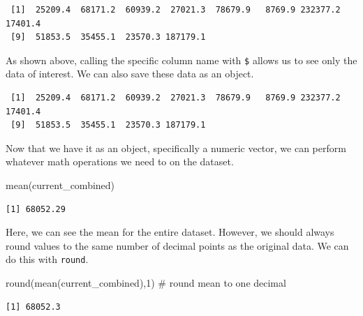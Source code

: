 \documentclass[
  letterpaper,
  DIV=11,
  numbers=noendperiod]{scrreprt}
\newenvironment{Shaded}{\begin{snugshade}}{\end{snugshade}}
\newcommand{\CommentTok}[1]{\textcolor[rgb]{0.37,0.37,0.37}{#1}}
\newcommand{\DecValTok}[1]{\textcolor[rgb]{0.68,0.00,0.00}{#1}}
\newcommand{\FunctionTok}[1]{\textcolor[rgb]{0.28,0.35,0.67}{#1}}
\newcommand{\NormalTok}[1]{\textcolor[rgb]{0.00,0.23,0.31}{#1}}
\newcommand{\OtherTok}[1]{\textcolor[rgb]{0.00,0.23,0.31}{#1}}
\newcommand{\SpecialCharTok}[1]{\textcolor[rgb]{0.37,0.37,0.37}{#1}}
\begin{document}
\begin{verbatim}
 [1]  25209.4  68171.2  60939.2  27021.3  78679.9   8769.9 232377.2  17401.4
 [9]  51853.5  35455.1  23570.3 187179.1
\end{verbatim}

As shown above, calling the specific column name with \texttt{\$} allows
us to see only the data of interest. We can also save these data as an
object.

\begin{Shaded}
\end{Shaded}

\begin{verbatim}
 [1]  25209.4  68171.2  60939.2  27021.3  78679.9   8769.9 232377.2  17401.4
 [9]  51853.5  35455.1  23570.3 187179.1
\end{verbatim}

Now that we have it as an object, specifically a numeric vector, we can
perform whatever math operations we need to on the dataset.

\begin{Shaded}
\begin{Highlighting}[]
\FunctionTok{mean}\NormalTok{(current\_combined)}
\end{Highlighting}
\end{Shaded}

\begin{verbatim}
[1] 68052.29
\end{verbatim}

Here, we can see the mean for the entire dataset. However, we should
always round values to the same number of decimal points as the original
data. We can do this with \texttt{round}.

\begin{Shaded}
\begin{Highlighting}[]
\FunctionTok{round}\NormalTok{(}\FunctionTok{mean}\NormalTok{(current\_combined),}\DecValTok{1}\NormalTok{) }\CommentTok{\# round mean to one decimal}
\end{Highlighting}
\end{Shaded}

\begin{verbatim}
[1] 68052.3
\end{verbatim}
\end{document}
